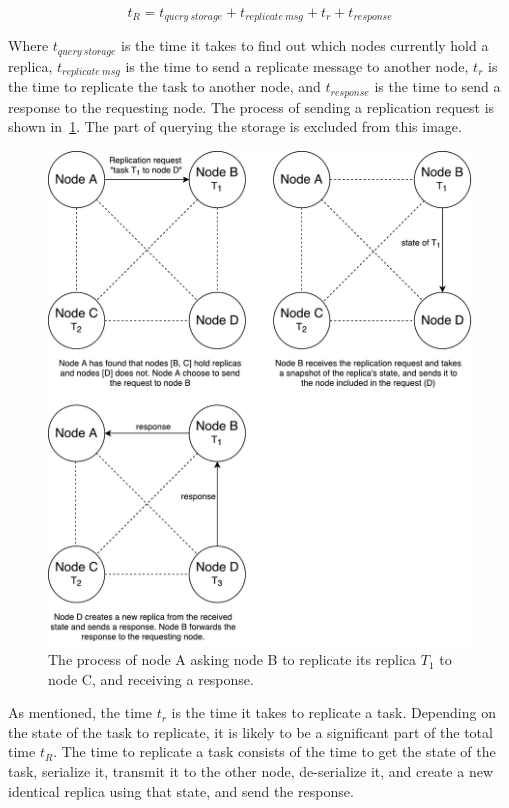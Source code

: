 \documentclass{cslthse-msc}
\begin{document}
\begin{equation} \label{eq:replication_request_time}
t_R = t_{query\ storage} + t_{replicate\ msg} + t_{r} + t_{response}
\end{equation} 

Where $t_{query\ storage}$ is the time it takes to find out which nodes currently hold a replica, $t_{replicate\ msg}$ is the time to send a replicate message to another node, $t_{r}$ is the time to replicate the task to another node, and $t_{response}$ is the time to send a response to the requesting node. The process of sending a replication request is shown in~\cref{fig:replication_request}. The part of querying the storage is excluded from this image.

\begin{figure}[!hbt]
\centering
\includegraphics[scale=0.5]{images/replication_request.pdf}
\caption[Replication request]{The process of node A asking node B to replicate its replica $T_{1}$ to node C, and receiving a response.}\label{fig:replication_request}
\end{figure}

As mentioned, the time $t_r$ is the time it takes to replicate a task. Depending on the state of the task to replicate, it is likely to be a significant part of the total time $t_R$. The time to replicate a task consists of the time to get the state of the task, serialize it, transmit it to the other node, de-serialize it, and create a new identical replica using that state, and send the response. 
\end{document}
